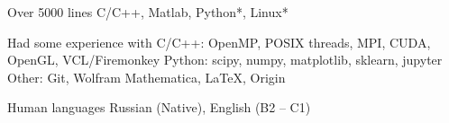 

\begin{cvskills}

  \cvskill
    {Over 5000 lines} %
    {C/C++, Matlab, Python*, Linux*} %

  \cvskill
    {Had some experience with} %
    {\newline C/C++: OpenMP, POSIX threads, MPI, CUDA, OpenGL, VCL/Firemonkey \newline Python: scipy, numpy, matplotlib, sklearn, jupyter \newline Other: Git, Wolfram Mathematica, \LaTeX, Origin \newline} %

  \cvskill
    {Human languages} %
    {Russian (Native), English (B2 -- C1)} %

\end{cvskills}
